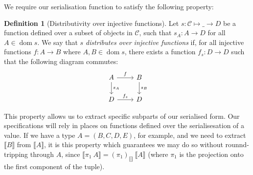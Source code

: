 \documentclass[11pt,a4paper]{article}
\DeclareMathOperator{\dom}{dom}
\newcommand{\var}[1]{\mathit{#1}}
\theoremstyle{definition}
\newtheorem{definition}{Definition}[section]
\theoremstyle{remark}
\begin{document}
We require our serialisation function to satisfy the following property:
\begin{definition}[Distributivity over injective functions]
  Let $s:\mathcal{C}\mapsto\_\to\var{D}$ be a function defined over a subset of
  objects in $\mathcal{C}$, such that $s_A:A\to\var{D}$ for all $A\in\dom{s}$.
  We say that $s$ \textit{distributes over injective functions} if, for all
  injective functions $f:A\to B$ where $A,B\in\dom{s}$, there exists a function
  $f_s:\var{D}\to\var{D}$ such that the following diagram commutes:
  \[
    \begin{tikzcd}
      A \arrow{r}{f} \arrow{d}{s_A} & B \arrow{d}{s_B} \\
      D \arrow{r}{f_s} & D
    \end{tikzcd}
  \]
\end{definition}

This property allows us to extract specific subparts of our serialised form. Our
specifications will rely in places on functions defined over the serialisesation
of a value. If we have a type $A=(B,C,D,E)$, for example, and we need to extract
$\llbracket\var{B}\rrbracket$ from $\llbracket\var{A}\rrbracket$, it is this
property which guarantees we may do so without rounnd-tripping through $A$,
since $\llbracket \pi_1 ~ A\rrbracket = (\pi_1)_{\llbracket\rrbracket} ~ \llbracket A
\rrbracket$ (where $\pi_1$ is the projection onto the first component of the tuple).
\end{document}
